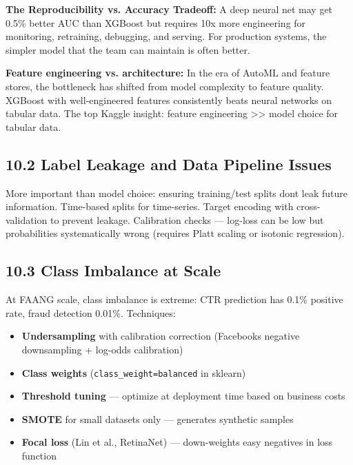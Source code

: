 \documentclass[11pt]{article}
\providecommand{\tightlist}{\setlength{\itemsep}{1pt}\setlength{\parskip}{0pt}}
\begin{document}
\textbf{The Reproducibility vs. Accuracy Tradeoff:}
A deep neural net may get 0.5\% better AUC than XGBoost but requires 10x more engineering for monitoring, retraining, debugging, and serving. For production systems, the simpler model that the team can maintain is often better.

\textbf{Feature engineering vs. architecture:}
In the era of AutoML and feature stores, the bottleneck has shifted from model complexity to feature quality. XGBoost with well-engineered features consistently beats neural networks on tabular data. The top Kaggle insight: feature engineering \textgreater\textgreater{} model choice for tabular data.

\subsection{10.2 Label Leakage and Data Pipeline Issues}\label{102-label-leakage-and-data-pipeline-issues}

More important than model choice: ensuring training/test splits don\textquotesingle t leak future information. Time-based splits for time-series. Target encoding with cross-validation to prevent leakage. Calibration checks --- log-loss can be low but probabilities systematically wrong (requires Platt scaling or isotonic regression).

\subsection{10.3 Class Imbalance at Scale}\label{103-class-imbalance-at-scale}

At FAANG scale, class imbalance is extreme: CTR prediction has 0.1\% positive rate, fraud detection 0.01\%. Techniques:

\begin{itemize}
\tightlist
\item
  \textbf{Undersampling} with calibration correction (Facebook\textquotesingle s negative downsampling + log-odds calibration)
\item
  \textbf{Class weights} (\texttt{class\_weight=\textquotesingle{}balanced\textquotesingle{}} in sklearn)
\item
  \textbf{Threshold tuning} --- optimize at deployment time based on business costs
\item
  \textbf{SMOTE} for small datasets only --- generates synthetic samples
\item
  \textbf{Focal loss} (Lin et al., RetinaNet) --- down-weights easy negatives in loss function
\end{itemize}
\end{document}
